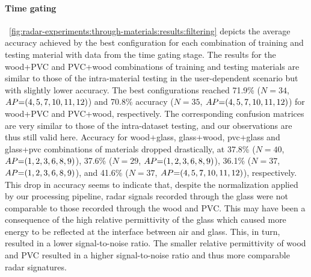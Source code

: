 \paragraph{Time gating}
\fig~\ref{fig:radar-experiments:through-materials:results:filtering} depicts the average accuracy achieved by the best configuration for each combination of training and testing material with data from the time gating stage.
The results for the wood+PVC and PVC+wood combinations of training and testing materials are similar to those of the intra-material testing in the user-dependent scenario but with slightly lower accuracy. 
%
The best configurations reached 71.9\% ($N{=}34$, $\splitatcommas{AP{=}(4, 5, 7, 10, 11, 12)}$) and 70.8\% accuracy ($N{=}35$, $\splitatcommas{AP{=}(4, 5, 7, 10, 11, 12)}$) for wood+PVC and PVC+wood, respectively.
%
The corresponding confusion matrices are very similar to those of the intra-dataset testing, and our observations are thus still valid here. 
Accuracy for wood+glass, glass+wood, pvc+glass and glass+pvc combinations of materials dropped drastically, at 37.8\% ($N{=}40$, $\splitatcommas{AP{=}(1, 2, 3, 6, 8, 9)}$), 37.6\% ($N{=}29$, $\splitatcommas{AP{=}(1, 2, 3, 6, 8, 9)}$), 36.1\% ($N{=}37$, $\splitatcommas{AP{=}(1, 2, 3, 6, 8, 9)}$), and 41.6\% ($N{=}37$, $\splitatcommas{AP{=}(4, 5, 7, 10, 11, 12)}$), respectively.
%
This drop in accuracy seems to indicate that, despite the normalization applied by our processing pipeline, radar signals recorded through the glass were not comparable to those recorded through the wood and PVC. This may have been a consequence of the high relative permittivity of the glass which caused more energy to be reflected at the interface between air and glass. This, in turn, resulted in a lower signal-to-noise ratio. 
%
The smaller relative permittivity of wood and PVC resulted in a higher signal-to-noise ratio and thus more comparable radar signatures.


